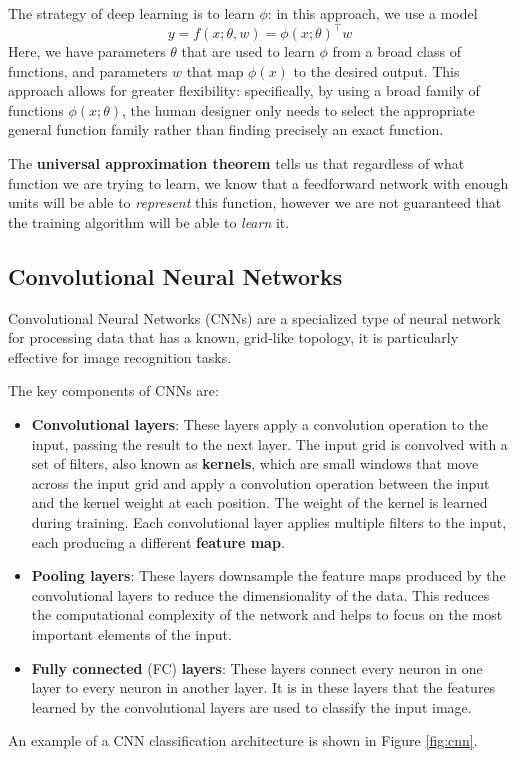 The strategy of deep learning is to learn \( \phi \):
in this approach, we use a model
\begin{equation}
y = f(x; \theta, w) = \phi(x; \theta)^\top w
\end{equation}
Here, we have parameters \( \theta \) that are used to learn \( \phi \)
from a broad class of functions, and parameters \( w \) that map \( \phi(x) \)
to the desired output.
This approach allows for greater flexibility:
specifically, by using a broad family of functions
\( \phi(x; \theta) \), the human designer only needs to select the appropriate
general function family rather than finding precisely an exact function.

The \textbf{universal approximation theorem} \cite{HORNIK1989359}
tells us that regardless of what function
we are trying to learn, we know that a feedforward network with enough units
will be able to \emph{represent} this
function, however we are not guaranteed that the training algorithm will be able
to \emph{learn} it.

\subsection{Convolutional Neural Networks}
\label{sec:cnn}

Convolutional Neural Networks (CNNs) are a specialized type of neural network
for processing data that has a known, grid-like topology,
it is particularly effective for image recognition tasks.

The key components of CNNs are:
\begin{itemize}
    \item \textbf{Convolutional layers}: These layers apply a convolution operation
    to the input, passing the result to the next layer.
    The input grid is convolved with a set of filters,
    also known as \textbf{kernels}, which are small windows that move across the input grid
    and apply a convolution operation between the input and the kernel weight
    at each position. The weight of the kernel is learned during training.
    Each convolutional layer applies multiple filters to the input, each producing
    a different \textbf{feature map}.
    \item \textbf{Pooling layers}: These layers downsample the feature maps
    produced by the convolutional layers to reduce the dimensionality of the data.
    This reduces the computational complexity of the network and helps to focus
    on the most important elements of the input.
    \item \textbf{Fully connected} (FC) \textbf{layers}: These layers connect every neuron
    in one layer to every neuron in another layer.
    It is in these layers that the features learned by the convolutional layers
    are used to classify the input image.
\end{itemize}
An example of a CNN classification architecture is shown in Figure \ref{fig:cnn}.

